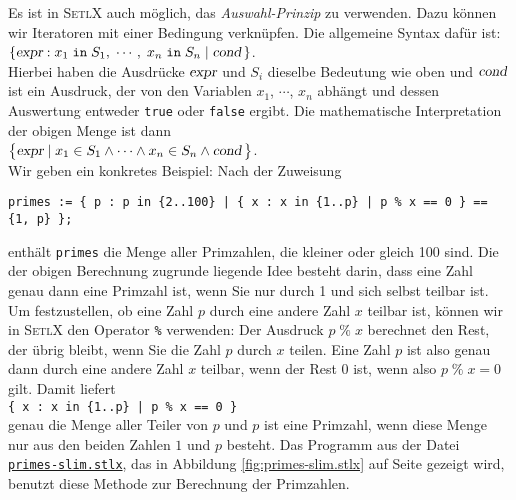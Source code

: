 Es ist in \textsc{SetlX} auch möglich, das \emph{Auswahl-Prinzip} zu verwenden.  Dazu
können wir Iteratoren mit einer Bedingung verknüpfen.   Die allgemeine Syntax
dafür ist: \\[0.2cm]
\hspace*{1.3cm}  
$\{ \textsl{expr} : x_1 \;\mathtt{in}\; S_1,\; \cdots,\; x_n \;\mathtt{in}\; S_n \mid \textsl{cond}\, \}$. 
\\[0.2cm]
Hierbei haben die Ausdrücke  $\textsl{expr}$ und $S_i$ dieselbe
Bedeutung wie oben und 
 $\textsl{cond}$ ist ein Ausdruck, der von den Variablen $x_1$, $\cdots$, $x_n$ abhängt und dessen Auswertung
entweder \texttt{true} oder \texttt{false} ergibt.  Die mathematische
Interpretation der obigen Menge ist dann \\[0.2cm]
\hspace*{1.3cm} 
$\bigl\{ \textsl{expr} \mid x_1 \in S_1 \wedge \cdots \wedge x_n \in S_n \wedge \textsl{cond} \,\bigr\}$. 
\\[0.2cm]
Wir geben ein konkretes Beispiel: Nach der Zuweisung
\begin{alltt}
  \texttt{primes := \{ p : p in  \{2..100\} | \{ x : x in \{1..p\} | p \% x == 0 \} == \{1, p\} \};}
\end{alltt}
 enthält \texttt{primes} die Menge aller Primzahlen, die
kleiner oder gleich 100 sind.  Die der obigen Berechnung zugrunde liegende Idee
besteht darin, dass eine Zahl genau dann eine Primzahl ist, wenn Sie nur durch 1
und sich selbst teilbar ist.  Um festzustellen, ob eine Zahl $p$ durch eine
andere Zahl $x$ teilbar ist, können wir in \textsc{SetlX} den Operator
\texttt{\%} verwenden: Der Ausdruck $p \;\texttt{\%}\; x$ berechnet den Rest,
der übrig bleibt, wenn Sie die Zahl $p$ durch $x$ teilen.  
Eine Zahl $p$ ist also genau dann durch eine andere Zahl $x$ teilbar, wenn der
Rest $0$ ist, wenn also  \texttt{$p \;\texttt{\%}\; x = 0$}
gilt.  Damit liefert \\[0.2cm]
\hspace*{1.3cm} \texttt{\{ x : x in \{1..p\} | p \% x == 0 \}}
\\[0.2cm]
genau die Menge aller Teiler von $p$ und $p$ ist eine Primzahl, wenn diese Menge
nur aus den beiden Zahlen $1$ und $p$ besteht.  Das Programm aus der Datei 
\href{https://github.com/karlstroetmann/Logik/blob/master/SetlX/primes-slim.stlx}{\texttt{primes-slim.stlx}}, 
das in Abbildung
\ref{fig:primes-slim.stlx} auf Seite \pageref{fig:primes-slim.stlx} gezeigt wird, benutzt diese Methode
zur Berechnung der Primzahlen.

